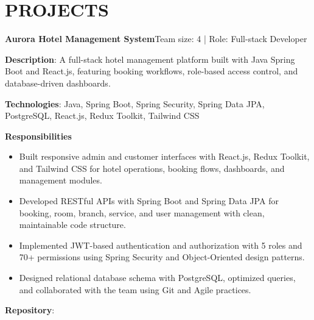 \section{PROJECTS}
\resumeSubHeadingListStart

  \resumeProjectHeading
    {\textbf{Aurora Hotel Management System}}{Team size: 4 | Role: Full-stack Developer}
    \resumeItemListStart
      \item \textbf{Description}: A full-stack hotel management platform built with Java Spring Boot and React.js,
        featuring booking workflows, role-based access control, and database-driven dashboards.
      \item \textbf{Technologies}: Java, Spring Boot, Spring Security, Spring Data JPA, PostgreSQL, React.js, Redux Toolkit, Tailwind CSS
      \item \textbf{Responsibilities}
        \begin{itemize}
          \item Built responsive admin and customer interfaces with React.js, Redux Toolkit, and Tailwind CSS for hotel operations, booking flows, dashboards, and management modules.
          \item Developed RESTful APIs with Spring Boot and Spring Data JPA for booking, room, branch, service, and user management with clean, maintainable code structure.
          \item Implemented JWT-based authentication and authorization with 5 roles and 70+ permissions using Spring Security and Object-Oriented design patterns.
          \item Designed relational database schema with PostgreSQL, optimized queries, and collaborated with the team using Git and Agile practices.
        \end{itemize}
      \item \textbf{Repository}: \href{https://github.com/nvminh162/aurora-hotel-management-system}{}
    \resumeItemListEnd

